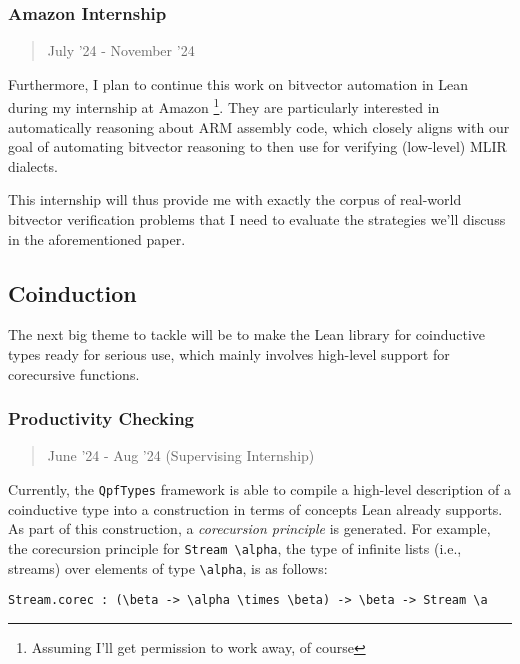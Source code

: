 \documentclass[a4paper]{scrartcl}
\begin{document}
\subsubsection{Amazon Internship}\label{amazon-internship}

\begin{quote}
July '24 - November '24
\end{quote}

Furthermore, I plan to continue this work on bitvector automation in
Lean during my internship at Amazon \footnote{ Assuming I'll get
  permission to work away, of course}. They are particularly interested
in automatically reasoning about ARM assembly code, which closely aligns
with our goal of automating bitvector reasoning to then use for
verifying (low-level) MLIR dialects.

This internship will thus provide me with exactly the corpus of real-world bitvector verification problems that I need to evaluate the strategies we'll discuss in the 
aforementioned paper.

\subsection{Coinduction}\label{coinduction}

The next big theme to tackle will be to make the Lean library for
coinductive types ready for serious use, which mainly involves
high-level support for corecursive functions.


\subsubsection{Productivity Checking}\label{productivity-checking}

\begin{quote}
June '24 - Aug '24 (Supervising Internship)
\end{quote}

Currently, the \texttt{QpfTypes} framework is able to compile a
high-level description of a coinductive type into a construction in
terms of concepts Lean already supports. As part of this construction, a
\emph{corecursion principle} is generated. For example, the corecursion
principle for \texttt{Stream\ \textbackslash{}alpha}, the type of
infinite lists (i.e., streams) over elements of type
\texttt{\textbackslash{}alpha}, is as follows:

\begin{verbatim}
Stream.corec : (\beta -> \alpha \times \beta) -> \beta -> Stream \a
\end{verbatim}
\end{document}
